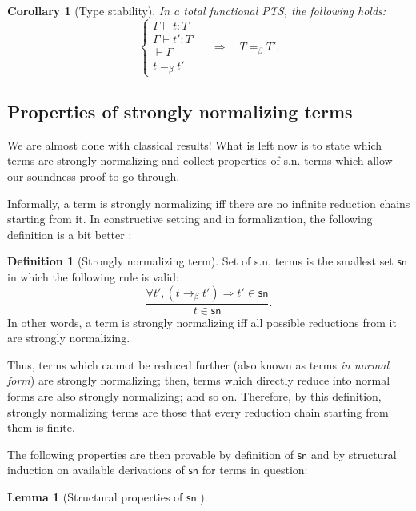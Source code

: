 \documentclass{article}
\newtheorem{lemma}{Lemma}
\newtheorem{corollary}{Corollary}
\theoremstyle{definition}
\newtheorem{definition}{Definition}
\theoremstyle{remark}
\begin{document}
\begin{corollary}[Type stability]
    In a total functional PTS, the following holds:
    \[\left\{\begin{array}{l}
        \Gamma\vdash t:T\\
        \Gamma\vdash t':T'\\
        \vdash\Gamma\\
        t =_\beta t'
    \end{array}\right.\quad\Rightarrow\quad
    T=_\beta T'.\]
\end{corollary}

\subsection{Properties of strongly normalizing terms}

We are almost done with classical results! What is left
now is to state which terms are strongly normalizing
and collect properties of s.n. terms which allow our
soundness proof to go through.

Informally, a term is strongly normalizing iff there
are no infinite reduction chains starting from it.
In constructive setting and in formalization, the
following definition is a bit better
\cite{altenkirch1993formalization,
vanraamsdonk1999perpetual}:

\begin{definition}[Strongly normalizing term]
\label{sn-definition}
    Set of s.n. terms is the smallest set $\mathsf{sn}$
    in which the following rule is valid:
    \[\dfrac{\forall t',(t\to_\beta t')\Rightarrow
        t'\in\mathsf{sn}}{t\in\mathsf{sn}}.\]
    In other words, a term is strongly normalizing iff
    all possible reductions from it are strongly
    normalizing.
\end{definition}

Thus, terms which cannot be reduced further (also known
as terms \emph{in normal form}) are strongly
normalizing; then, terms which directly reduce into
normal forms are also strongly normalizing; and so on.
Therefore, by this definition, strongly normalizing
terms are those that every reduction chain starting
from them is finite.

The following properties are then provable by
definition of $\mathsf{sn}$ and by structural induction
on available derivations of $\mathsf{sn}$ for terms in
question:

\begin{lemma}[Structural properties of $\mathsf{sn}$
    ]
\label{sn-props}
\end{lemma}
\end{document}
